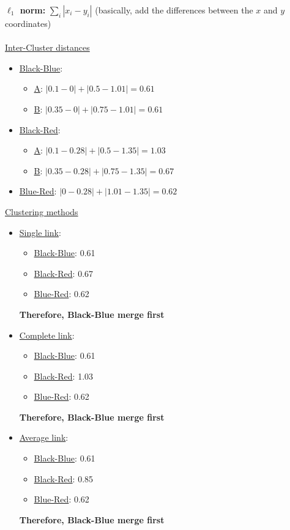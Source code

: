 \documentclass[submit]{harvardml}
\begin{document}
\textbf{$\ell_1$ norm:} $\sum_i |x_i - y_i|$ (basically, add the differences between the $x$ and $y$ coordinates)\\ \\
	\underline{Inter-Cluster distances}
	\begin{itemize}
		\item \underline{Black-Blue}:
			\begin{itemize}
				\item \underline{A}: $|0.1 - 0|  + |0.5 - 1.01| = 0.61$
				\item \underline{B}: $|0.35- 0| + |0.75 - 1.01| = 0.61$
			\end{itemize}
		\item \underline{Black-Red}:
			\begin{itemize}
				\item \underline{A}: $|0.1 -0.28| + |0.5-1.35| = 1.03$
				\item \underline{B}: $|0.35-0.28| + |0.75-1.35| = 0.67$
			\end{itemize}
		\item \underline{Blue-Red}: $|0-0.28| + |1.01 - 1.35| = 0.62$
	\end{itemize}
	\underline{Clustering methods}
	\begin{itemize}
		\item \underline{Single link}:
			\begin{itemize}
				\item \underline{Black-Blue}: 0.61
				\item \underline{Black-Red}: 0.67
				\item \underline{Blue-Red}: 0.62
			\end{itemize}
		\textbf{Therefore, Black-Blue merge first}
		\item \underline{Complete link}:
			\begin{itemize}
				\item \underline{Black-Blue}: 0.61
				\item \underline{Black-Red}: 1.03
				\item \underline{Blue-Red}: 0.62
			\end{itemize}
		\textbf{Therefore, Black-Blue merge first}
		\item \underline{Average link}:
			\begin{itemize}
				\item \underline{Black-Blue}: 0.61
				\item \underline{Black-Red}: 0.85
				\item \underline{Blue-Red}: 0.62
			\end{itemize}
		\textbf{Therefore, Black-Blue merge first}	
	\end{itemize}
	
\end{document}

